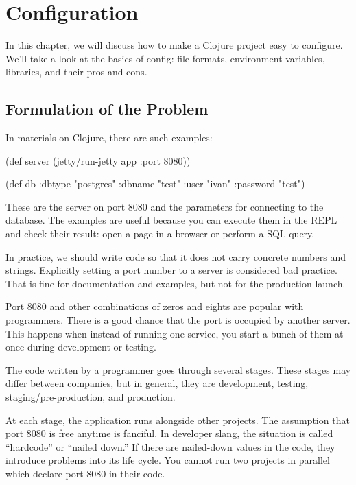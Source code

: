 \chapter{Configuration}


\label{chapter-config}

\begin{teaser}
In this chapter, we will discuss how to make a Clojure project easy to configure. We'll take a look at the basics of config: file formats, environment variables, libraries, and their pros and cons.
\end{teaser}

\section{Formulation of the Problem}

In materials on Clojure, there are such examples:

\begin{clojure}
(def server
  (jetty/run-jetty app {:port 8080}))

(def db {:dbtype   "postgres"
         :dbname   "test"
         :user     "ivan"
         :password "test"})
\end{clojure}

These are the server on port 8080 and the parameters for connecting to the database. The examples are useful because you can execute them in the REPL and check their result: open a page in a browser or perform a SQL query.

In practice, we should write code so that it does not carry concrete numbers and strings. Explicitly setting a port number to a server is considered bad practice. That is fine for documentation and examples, but not for the production launch.

Port 8080 and other combinations of zeros and eights are popular with programmers. There is a good chance that the port is occupied by another server. This happens when instead of running one service, you start a bunch of them at once during development or testing.

The code written by a programmer goes through several stages. These stages may differ between companies, but in general, they are development, testing, staging/pre-production, and production.

\label{hardcode}

At each stage, the application runs alongside other projects. The assumption that port 8080 is free anytime is fanciful. In developer slang, the situation is called ``hardcode'' or ``nailed down.'' If there are nailed-down values in the code, they introduce problems into its life cycle. You cannot run two projects in parallel which declare port 8080 in their code.

